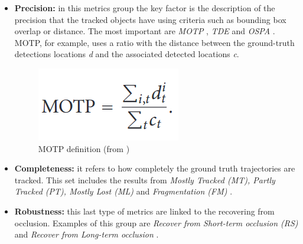 \begin{itemize}
    \item \textbf{Precision:} in this metrics group the key factor is the description of the precision that the tracked objects have using criteria such as bounding box overlap or distance. The most important are \textit{MOTP} \cite{bernardin2008evaluating}, \textit{TDE} \cite{kratz2010tracking} and \textit{OSPA} \cite{ristic2011metric}. MOTP, for example, uses a ratio with the distance between the ground-truth detections locations \textit{d} and the associated detected locations \textit{c}.
    \begin{figure}[H]
    \begin{center}
    \includegraphics[scale=0.4]{figures/motp.png}
    \caption{MOTP definition (from \cite{bernardin2008evaluating})}
    \label{fig:motp}
    \end{center}
    \end{figure}
    \item \textbf{Completeness:} it refers to how completely the ground truth trajectories are tracked. This set includes the results from \textit{Mostly Tracked (MT), Partly Tracked (PT), Mostly Lost (ML)} and \textit{Fragmentation (FM)} \cite{li2009learning}.
    \item \textbf{Robustness:} this last type of metrics are linked to the recovering from occlusion. Examples of this group are \textit{Recover from Short-term occlusion (RS)} and \textit{Recover from Long-term occlusion} \cite{song2010stochastic}.
\end{itemize}

